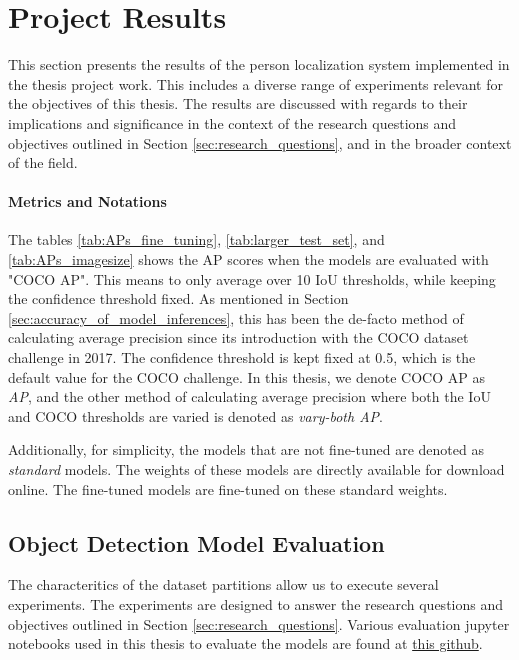 \section{Project Results}
\label{sec:results}
This section presents the results of the person localization system implemented in the thesis project work. This includes a diverse range of experiments relevant for the objectives of this thesis. The results are discussed with regards to their implications and significance in the context of the research questions and objectives outlined in Section \ref{sec:research_questions}, and in the broader context of the field.

\paragraph{Metrics and Notations}
The tables \ref{tab:APs_fine_tuning}, \ref{tab:larger_test_set}, and \ref{tab:APs_imagesize} shows the AP scores when the models are evaluated with "COCO AP". This means to only average over 10 IoU thresholds, while keeping the confidence threshold fixed. As mentioned in Section \ref{sec:accuracy_of_model_inferences}, this has been the de-facto method of calculating average precision since its introduction with the COCO dataset challenge in 2017. The confidence threshold is kept fixed at 0.5, which is the default value for the COCO challenge. In this thesis, we denote COCO AP as \textit{AP}, and the other method of calculating average precision where both the IoU and COCO thresholds are varied is denoted as \textit{vary-both AP}. 

Additionally, for simplicity, the models that are not fine-tuned are denoted as \textit{standard} models. The weights of these models are directly available for download online. The fine-tuned models are fine-tuned on these standard weights.

\subsection{Object Detection Model Evaluation}
\label{sec:object_detection_model_evaluation}
The characteritics of the dataset partitions allow us to execute several experiments. The experiments are designed to answer the research questions and objectives outlined in Section \ref{sec:research_questions}. Various evaluation jupyter notebooks used in this thesis to evaluate the models are found at \href{github.com/hallvaeb/masterthesis}{this github}. 


